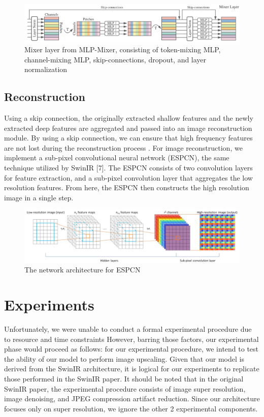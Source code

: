 \documentclass{article}
\begin{document}
\begin{figure}\label{fig:mixer}
    \centering
    \includegraphics[width=\textwidth]{mixer-layer.png}
    \caption{Mixer layer from MLP-Mixer, consisting of token-mixing MLP, channel-mixing MLP, skip-connections, dropout, and layer normalization}
\end{figure}

\subsection{Reconstruction}

Using a skip connection, the originally extracted shallow features and the newly extracted deep features are aggregated and passed into an image reconstruction module. By using a skip connection, we can ensure that high frequency features are not lost during the reconstruction process \citep{liang2021swinir}. For image reconstruction, we implement a sub-pixel convolutional neural network (ESPCN), the same technique utilized by SwinIR [7]. The ESPCN consists of two convolution layers for feature extraction, and a sub-pixel convolution layer that aggregates the low resolution features. From here, the ESPCN then constructs the high resolution image in a single step.

\begin{figure}\label{fig:escpn}
    \centering
    \includegraphics[width=\textwidth]{espcn.png}
    \caption{The network architecture for ESPCN}
\end{figure}

\section{Experiments}

Unfortunately, we were unable to conduct a formal experimental procedure due to resource and time constraints However, barring those factors, our experimental phase would proceed as follows: for our experimental procedure, we intend to test the ability of our model to perform image upscaling. Given that our model is derived from the SwinIR architecture, it is logical for our experiments to replicate those performed in the SwinIR paper. It should be noted that in the original SwinIR paper, the experimental procedure consists of image super resolution, image denoising, and JPEG compression artifact reduction. Since our architecture focuses only on super resolution, we ignore the other 2 experimental components.
\end{document}
